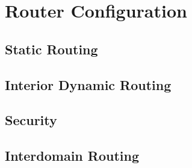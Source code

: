 \chapter{Router Configuration}
\section{Static Routing}
\section{Interior Dynamic Routing}
\section{Security}
\section{Interdomain Routing}